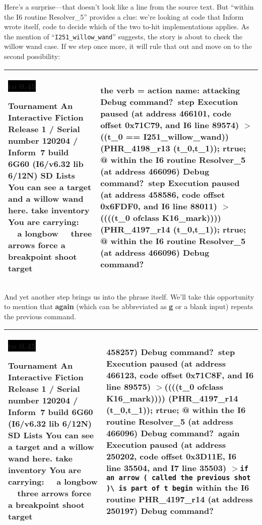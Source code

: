 \documentclass{book}
\newcommand{\n}{\hspace*{\fill}\newline}
\newcommand{\terp}[2]{\begin{center}\begin{tabular}{p{0.45\textwidth}|p{0.45\textwidth}}\midrule #1&#2\\\midrule\end{tabular}\end{center}}
\newcommand{\glkheading}[1]{\textbf{#1}}
\newcommand{\glkinput}[1]{\textbf{#1}}
\newcommand{\glkstatusline}[2]{\centerline{\colorbox{black}{\hbox to 0.45\textwidth{\textcolor{white}{#1\hfil #2}}}}}
\newcommand{\storyprompt}{\raisebox{1.5pt}{\(>\)}}
\newcommand{\cursor}{\raisebox{-1.5pt}{\RectangleThin}}
\newcommand{\markedindent}{\(>\)\qquad}
\begin{document}
Here's a surprise---that doesn't look like a line from the source text.  But
``within the I6 routine Resolver\_5'' provides a clue: we're looking at code
that Inform wrote itself, code to decide which of the two to-hit implementations
applies.  As the mention of ``\lstinline{I251_willow_wand}'' suggests, the story
is about to check the willow wand case.  If we step once more, it will rule that
out and move on to the second possibility:

\terp{\glkstatusline{Lists}{0/2}\n
  \glkheading{Tournament}\n
  An Interactive Fiction\n
  Release 1 / Serial number 120204 / Inform~7 build 6G60 (I6/v6.32 lib 6/12N) SD\n
  \n
  \glkheading{Lists}\n
  You can see a target and a willow wand here.\n
  \n
  \storyprompt\glkinput{take inventory}\n
  You are carrying:\n
  \null\ \ a longbow\n
  \null\ \ three arrows\n
  \n
  \storyprompt\glkinput{force a breakpoint}\n
  \storyprompt\glkinput{shoot target}}{%
  the verb = action name: attacking\n
  \n
  Debug command?\ \glkinput{step}\n
  \n
  Execution paused (at address 466101, code offset 0x71C79, and I6 line 89574)\n
  \markedindent \lstinline@if ((t\_0 == I251\_willow\_wand)) { (PHR\_4198\_r13 (t\_0,t\_1)); rtrue; }@\n
  within the I6 routine Resolver\_5 (at address 466096)\n
  \n
  Debug command?\ \glkinput{step}\n
  \n
  Execution paused (at address 458586, code offset 0x6FDF0, and I6 line 88011)\n
  \markedindent \lstinline@if ((((t\_0 ofclass K16\_mark)))) { (PHR\_4197\_r14 (t\_0,t\_1)); rtrue; }@\n
  within the I6 routine Resolver\_5 (at address 466096)\n
  \n
  Debug command?\ \cursor}

And yet another step brings us into the phrase itself.  We'll take this
opportunity to mention that \glkinput{again} (which can be abbreviated as
\glkinput{g} or a blank input) repeats the previous command.

\terp{\glkstatusline{Lists}{0/2}\n
  \glkheading{Tournament}\n
  An Interactive Fiction\n
  Release 1 / Serial number 120204 / Inform~7 build 6G60 (I6/v6.32 lib 6/12N) SD\n
  \n
  \glkheading{Lists}\n
  You can see a target and a willow wand here.\n
  \n
  \storyprompt\glkinput{take inventory}\n
  You are carrying:\n
  \null\ \ a longbow\n
  \null\ \ three arrows\n
  \n
  \storyprompt\glkinput{force a breakpoint}\n
  \storyprompt\glkinput{shoot target}}{%
  458257)\n
  \n
  Debug command?\ \glkinput{step}\n
  \n
  Execution paused (at address 466123, code offset 0x71C8F, and I6 line 89575)\n
  \markedindent \lstinline@if ((((t\_0 ofclass K16\_mark)))) { (PHR\_4197\_r14 (t\_0,t\_1)); rtrue; }@\n
  within the I6 routine Resolver\_5 (at address 466096)\n
  \n
  Debug command?\ \glkinput{again}\n
  \n
  Execution paused (at address 250202, code offset 0x3D11E, I6 line 35504, and I7 line 35503)\n
  \markedindent \lstinline{if an arrow ( called the previous shot )}\lstinline{\ is part of t begin}\n
  within the I6 routine PHR\_4197\_r14 (at address 250197)\n
  \n
  Debug command?\ \cursor}
\end{document}
